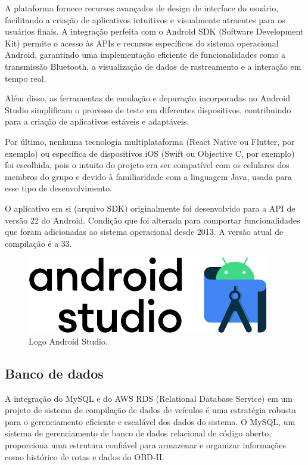     A plataforma fornece recursos avançados de design de interface do usuário, facilitando a criação de aplicativos intuitivos e visualmente atraentes para os usuários finais. A integração perfeita com o Android SDK (Software Development Kit) permite o acesso às APIs e recursos específicos do sistema operacional Android, garantindo uma implementação eficiente de funcionalidades como a transmissão Bluetooth, a visualização de dados de rastreamento e a interação em tempo real. 
    
    Além disso, as ferramentas de emulação e depuração incorporadas no Android Studio simplificam o processo de teste em diferentes dispositivos, contribuindo para a criação de aplicativos estáveis e adaptáveis.

    Por último, nenhuma tecnologia multiplataforma (React Native ou Flutter, por exemplo) ou específica de dispositivos iOS (Swift ou Objective C, por exemplo) foi escolhida, pois o intuito do projeto era ser compatível com os celulares dos membros do grupo e devido à familiaridade com a linguagem Java, usada para esse tipo de desenvolvimento.

    O aplicativo em si (arquivo SDK) originalmente foi desenvolvido para a API de versão 22 do Android. Condição que foi alterada para comportar funcionalidades que foram adicionadas ao sistema operacional desde 2013. A versão atual de compilação é a 33.

     \begin{figure}[hp]
    \centering
    
    \includegraphics[scale=0.4]{figures/logo_android.png}
    
    \caption{Logo Android Studio.}
    
\end{figure}
    
     \subsection{Banco de dados} A integração do MySQL e do AWS RDS (Relational Database Service) em um projeto de sistema de compilação de dados de veículos é uma estratégia robusta para o gerenciamento eficiente e escalável dos dados do sistema. O MySQL, um sistema de gerenciamento de banco de dados relacional de código aberto, proporciona uma estrutura confiável para armazenar e organizar informações como histórico de rotas e dados do OBD-II. 
     
